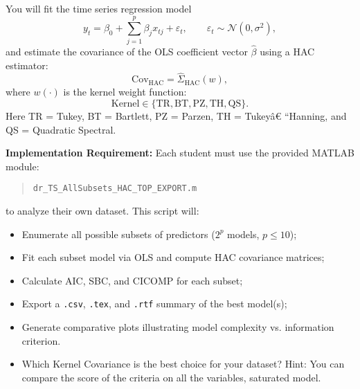 \documentclass[12pt,thmsa]{article}
\begin{document}
You will fit the time series regression model 
\begin{equation*}
y_{t}=\beta _{0}+\sum_{j=1}^{p}\beta _{j}x_{tj}+\varepsilon _{t},\qquad
\varepsilon _{t}\sim \mathcal{N}(0,\sigma ^{2}),
\end{equation*}%
and estimate the covariance of the OLS coefficient vector $\hat{\beta}$
using a HAC estimator: 
\begin{equation*}
\text{Cov}_{\text{HAC}}=\hat{\Sigma}_{\text{HAC}}(w),
\end{equation*}%
where $w(\cdot )$ is the kernel weight function: 
\begin{equation*}
\text{Kernel}\in \{\text{TR},\text{BT},\text{PZ},\text{TH},\text{QS}\}.
\end{equation*}%
Here TR = Tukey, BT = Bartlett, PZ = Parzen, TH = Tukey\^{a}\euro
\textquotedblleft Hanning, and QS = Quadratic Spectral.

\vspace{1pt}

\textbf{Implementation Requirement:} Each student must use the provided
MATLAB module:

\begin{quote}
\texttt{dr\_TS\_AllSubsets\_HAC\_TOP\_EXPORT.m}
\end{quote}

to analyze their own dataset. This script will:

\begin{itemize}
\item Enumerate all possible subsets of predictors ($2^{p}$ models, $p\leq
10 $);

\item Fit each subset model via OLS and compute HAC covariance matrices;

\item Calculate AIC, SBC, and CICOMP for each subset;

\item Export a \texttt{.csv}, \texttt{.tex}, and \texttt{.rtf} summary of
the best model(s);

\item Generate comparative plots illustrating model complexity vs.
information criterion.

\item Which Kernel Covariance is the best choice for your dataset? Hint: You
can compare the score of the criteria on all the variables, saturated model.
\end{itemize}

\vspace{1pt}
\end{document}

